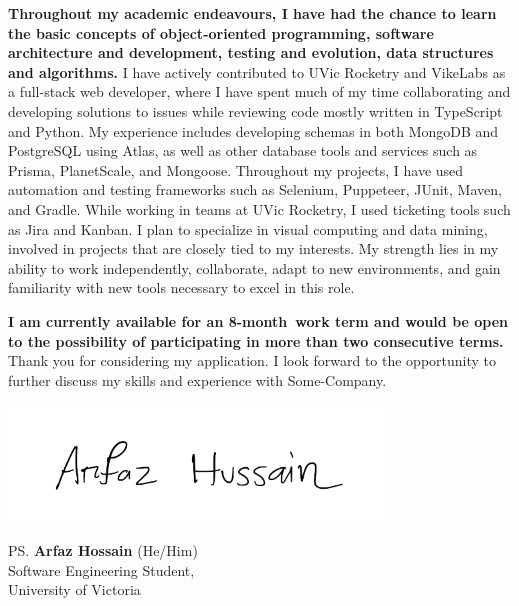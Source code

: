 \documentclass[a4paper, 12pt]{letter}
\newcommand{\CompanyName}{Some-Company}
\newcommand{\Terms}{an 8-month}
\begin{document}
\textbf{Throughout my academic endeavours, I have had the chance to learn the basic concepts of object-oriented programming, software architecture and development, testing and evolution, data structures and algorithms.} I have actively contributed to UVic Rocketry and VikeLabs as a full-stack web developer, where I have spent much of my time collaborating and developing solutions to issues while reviewing code mostly written in TypeScript and Python. My experience includes developing schemas in both MongoDB and PostgreSQL using Atlas, as well as other database tools and services such as Prisma, PlanetScale, and Mongoose. Throughout my projects, I have used automation and testing frameworks such as Selenium, Puppeteer, JUnit, Maven, and Gradle. While working in teams at UVic Rocketry, I used ticketing tools such as Jira and Kanban. I plan to specialize in visual computing and data mining, involved in projects that are closely tied to my interests. My strength lies in my ability to work independently, collaborate, adapt to new environments, and gain familiarity with new tools necessary to excel in this role.

\textbf{I am currently available for \Terms\ work term and would be open to the possibility of participating in more than two consecutive terms.} Thank you for considering my application. I look forward to the opportunity to further discuss my skills and experience with \CompanyName.

\vspace{10pt}

\vspace{-25pt}
\begin{flushleft}
    \hspace*{-1cm}\includegraphics[width=10cm]{signature.png}\vspace{-1cm}
\end{flushleft}

\vspace{-10pt}
\ps{\textbf{Arfaz Hossain} (He/Him)\\
Software Engineering Student,\\
University of Victoria}
\end{document}
